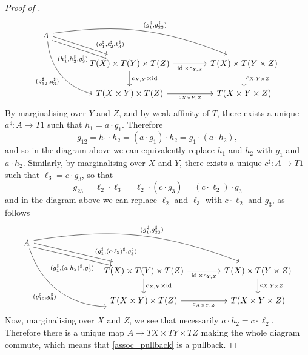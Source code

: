 \documentclass[a4paper,UKenglish,numberwithinsect,cleveref, autoref, thm-restate]{lipics-v2021}
\theoremstyle{plain} %
\theoremstyle{definition} %
\begin{document}
\begin{proof}[Proof of ]
\[\begin{tikzcd}[column sep=3.3pc]
   A \ar[bend left=15, shift left]{drr}{(g_1^\sharp,g_{23}^\sharp)} \ar[bend right=35]{ddr}[swap]{(g_{12}^\sharp,g_3^\sharp)} 
    \ar[shift left]{dr}[near end]{(g_1^\sharp,\ell_2^\sharp,\ell_3^\sharp)} \ar[shift right]{dr}[swap, pos=0.7]{(h_1^\sharp,h_2^\sharp, g_3^\sharp)} \\
   & T(X) \times T(Y) \times T(Z) \ar{r}[swap]{\id \times c_{Y,Z}} \ar{d}{c_{X,Y} \times \id}	& T(X) \times T(Y \times Z) \ar{d}{c_{X,Y \times Z}}	\\
   & T(X \times Y) \times T(Z) \ar{r}[swap]{c_{X\times Y,Z}}						& T(X \times Y \times Z)
  \end{tikzcd}
 \]
 By marginalising over $Y$ and $Z$, and by weak affinity of $T$, there exists a unique $a^\sharp:A\to T1$ such that $h_1 = a\cdot g_1$. 
 Therefore
 \[
  g_{12} = h_1\cdot h_2 = (a\cdot g_1) \cdot h_2 = g_1\cdot (a\cdot h_2) ,
 \]
 and so in the diagram above we can equivalently replace $h_1$ and $h_2$ with $g_1$ and $a\cdot h_2$.
 Similarly, by marginalising over $X$ and $Y$, there exists a unique $c^\sharp:A\to T1$ such that $\ell_3=c\cdot g_3$, so that
 \[
  g_{23}= \ell_2\cdot\ell_3 = \ell_2\cdot (c\cdot g_3) = (c\cdot \ell_2) \cdot g_3
 \]
 and in the diagram above we can replace $\ell_2$ and $\ell_3$ with $c\cdot \ell_2$ and $g_3$, as follows
 \[
  \begin{tikzcd}[column sep=3.3pc]
   A \ar[bend left=15, shift left]{drrr}{(g_1^\sharp,g_{23}^\sharp)} \ar[bend right=35]{ddrr}[swap]{(g_{12}^\sharp,g_3^\sharp)} 
    \ar[shift left]{drr}[near end]{(g_1^\sharp,(c\cdot\ell_2)^\sharp,g_3^\sharp)} \ar[shift right]{drr}[swap, pos=0.8]{(g_1^\sharp,(a\cdot h_2)^\sharp, g_3^\sharp)} \\
   && T(X) \times T(Y) \times T(Z) \ar{r}[swap]{\id \times c_{Y,Z}} \ar{d}{c_{X,Y} \times \id}	& T(X) \times T(Y \times Z) \ar{d}{c_{X,Y \times Z}}	\\
   && T(X \times Y) \times T(Z) \ar{r}[swap]{c_{X\times Y,Z}}						& T(X \times Y \times Z)
  \end{tikzcd}
 \]
 Now, marginalising over $X$ and $Z$, we see that necessarily $a\cdot h_2=c\cdot \ell_2$. 
 Therefore there is a unique map $A\to TX\times TY\times TZ$ making the whole diagram commute, which means that \eqref{assoc_pullback} is a pullback.
 

\end{proof}
\end{document}
